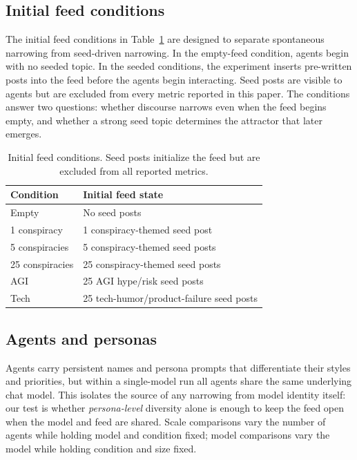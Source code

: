 \documentclass[11pt]{article}
\begin{document}
\subsection{Initial feed conditions}
\label{subsec:conditions}

The initial feed conditions in Table~\ref{tab:feed-conditions} are designed to separate spontaneous narrowing from seed-driven narrowing. In the empty-feed condition, agents begin with no seeded topic. In the seeded conditions, the experiment inserts pre-written posts into the feed before the agents begin interacting. Seed posts are visible to agents but are excluded from every metric reported in this paper. The conditions answer two questions: whether discourse narrows even when the feed begins empty, and whether a strong seed topic determines the attractor that later emerges.

\begin{table}[t]
\centering
\small
\begin{tabular}{lp{}}
\toprule
Condition & Initial feed state \\
\midrule
Empty & No seed posts \\
1 conspiracy & 1 conspiracy-themed seed post \\
5 conspiracies & 5 conspiracy-themed seed posts \\
25 conspiracies & 25 conspiracy-themed seed posts \\
AGI & 25 AGI hype/risk seed posts \\
Tech & 25 tech-humor/product-failure seed posts \\
\bottomrule
\end{tabular}
\caption{Initial feed conditions. Seed posts initialize the feed but are excluded from all reported metrics.}
\label{tab:feed-conditions}
\end{table}

\subsection{Agents and personas}
\label{subsec:agents}

Agents carry persistent names and persona prompts that differentiate their styles and priorities, but within a single-model run all agents share the same underlying chat model. This isolates the source of any narrowing from model identity itself: our test is whether \emph{persona-level} diversity alone is enough to keep the feed open when the model and feed are shared. Scale comparisons vary the number of agents while holding model and condition fixed; model comparisons vary the model while holding condition and size fixed.
\end{document}
